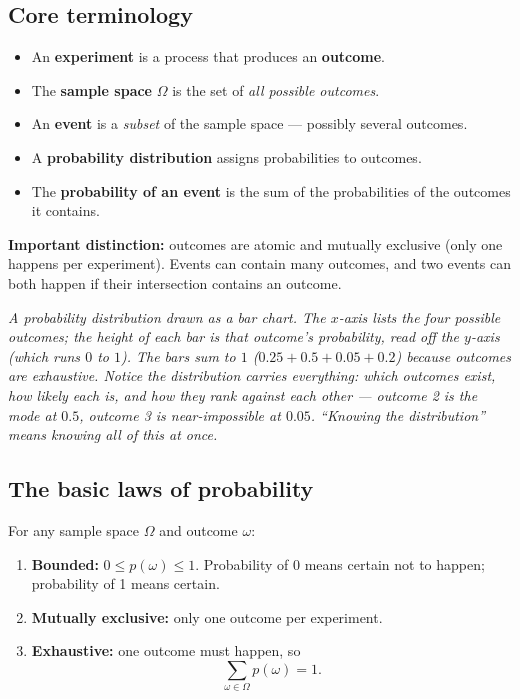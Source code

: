 \documentclass[11pt, a4paper]{article}
\begin{document}
\subsection{Core terminology}

\begin{defbox}
\begin{itemize}[leftmargin=*]
  \item An \textbf{experiment} is a process that produces an \textbf{outcome}.
  \item The \textbf{sample space} $\Omega$ is the set of \emph{all possible outcomes}.
  \item An \textbf{event} is a \emph{subset} of the sample space — possibly several outcomes.
  \item A \textbf{probability distribution} assigns probabilities to outcomes.
  \item The \textbf{probability of an event} is the sum of the probabilities of the outcomes it contains.
\end{itemize}
\end{defbox}

\textbf{Important distinction:} outcomes are atomic and mutually exclusive (only one happens per experiment). Events can contain many outcomes, and two events can both happen if their intersection contains an outcome.

\begin{center}

\footnotesize\textit{A probability distribution drawn as a bar chart. The $x$-axis lists the four possible outcomes; the height of each bar is that outcome's probability, read off the $y$-axis (which runs $0$ to $1$). The bars sum to $1$ ($0.25 + 0.5 + 0.05 + 0.2$) because outcomes are exhaustive. Notice the distribution carries everything: which outcomes exist, how likely each is, and how they rank against each other — outcome 2 is the mode at $0.5$, outcome 3 is near-impossible at $0.05$. ``Knowing the distribution'' means knowing all of this at once.}
\end{center}

\subsection{The basic laws of probability}

For any sample space $\Omega$ and outcome $\omega$:
\begin{enumerate}
  \item \textbf{Bounded:} $0 \le p(\omega) \le 1$. Probability of 0 means certain not to happen; probability of 1 means certain.
  \item \textbf{Mutually exclusive:} only one outcome per experiment.
  \item \textbf{Exhaustive:} one outcome must happen, so
  \[
  \sum_{\omega \in \Omega} p(\omega) = 1.
  \]
\end{enumerate}
\end{document}
